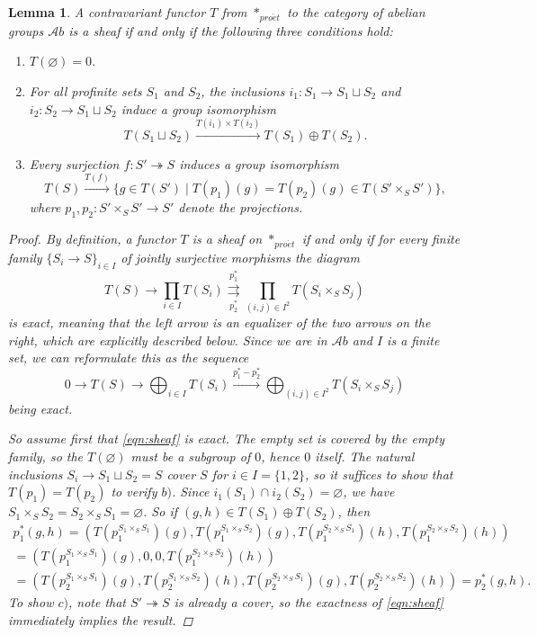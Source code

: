 \documentclass[11pt,A4]{article}
\theoremstyle{plain}
\newtheorem{lm}[thm]{Lemma}
\theoremstyle{definition}
\theoremstyle{remark}
\newcommand{\1}{\mathbbm{1}}
\newcommand{\Ab}{\mathscr{A}b}
\newcommand{\pe}{*_{pro\acute et}}
\newcommand{\op}{\oplus}
\begin{document}
\begin{lm}\label{lm:sheaf}
    A contravariant functor $T$ from $\pe$ to the category of abelian groups $\Ab$ is a sheaf if and only if the following three conditions hold:
    \begin{enumerate}[label=\alph*)]
	\item $T(\varnothing)=0$.
	\item For all profinite sets $S_{1}$ and $S_{2}$, the inclusions $i_{1}\colon S_{1}\to S_{1}\sqcup S_{2}$ and $i_{2}\colon S_{2}\to S_{1}\sqcup S_{2}$ induce a group isomorphism
	    \[ T(S_{1}\sqcup S_{2})\xrightarrow{T(i_{1})\times T(i_{2})} T(S_{1})\op T(S_{2}).\]
	\item Every surjection $f\colon S'\twoheadrightarrow S$ induces a group isomorphism
	    \[ T(S)\xrightarrow{T(f)} \{ g\in T(S') \mid T(p_{1})(g)=T(p_{2})(g) \in T(S'\times_{S}S') \}, \]
	    where $p_{1},p_{2}\colon S'\times_{S}S'\to S'$ denote the projections.
    \end{enumerate}
    \begin{proof}
	By definition, a functor $T$ is a sheaf on $\pe$ if and only if for every finite family $\{ S_{i}\to S\}_{i\in I}$ of jointly surjective morphisms the diagram
	\[ T(S)\to \prod_{i\in I} T(S_{i})\overset{p_{1}^{*}}{\underset{p_{2}^{*}}{\rightrightarrows}}\prod_{(i,j)\in I^{2}} T(S_{i}\times_{S} S_{j}) \]
	is exact, meaning that the left arrow is an equalizer of the two arrows on the right, which are explicitly described below.
	Since we are in $\Ab$ and $I$ is a finite set, we can reformulate this as the sequence
	\begin{equation}\label{eqn:sheaf}
	    0\to T(S)\to \bigoplus_{i\in I} T(S_{i})\xrightarrow{p_{1}^{*}-p_{2}^{*}} \bigoplus_{(i,j)\in I^{2}} T(S_{i}\times_{S}S_{j})
	\end{equation}
	being exact.

	So assume first that \ref{eqn:sheaf} is exact.
	The empty set is covered by the empty family, so the $T(\varnothing)$ must be a subgroup of $0$, hence $0$ itself.
	The natural inclusions $S_{i}\to S_{1}\sqcup S_{2}=S$ cover $S$ for $i\in I=\{1,2\}$, so it suffices to show that $T(p_{1})=T(p_{2})$ to verify $b)$.
	Since $i_{1}(S_{1})\cap i_{2}(S_{2})=\varnothing $, we have $S_{1}\times_{S}S_{2}=S_{2}\times_{S}S_{1}=\varnothing $.
	So if $(g,h)\in T(S_{1})\op T(S_{2})$, then
	\begin{multline*}
	    p_{1}^{*}(g,h)=(T(p_{1}^{S_{1}\times_{S}S_{1}})(g),T(p_{1}^{S_{1}\times_{S}S_{2}})(g),T(p_{1}^{S_{2}\times_{S}S_{1}})(h),T(p_{1}^{S_{2}\times_{S}S_{2}})(h)) \\ 
	    =(T(p_{1}^{S_{1}\times_{S}S_{1}})(g),0,0,T(p_{1}^{S_{2}\times_{S}S_{2}})(h)) \\
	    =(T(p_{2}^{S_{1}\times_{S}S_{1}})(g),T(p_{2}^{S_{1}\times_{S}S_{2}})(h),T(p_{2}^{S_{2}\times_{S}S_{1}})(g),T(p_{2}^{S_{2}\times_{S}S_{2}})(h))=p_{2}^{*}(g,h).
	\end{multline*}
	To show $c)$, note that $S'\twoheadrightarrow S$ is already a cover, so the exactness of \ref{eqn:sheaf} immediately implies the result.


\end{proof}
\end{lm}
\end{document}
